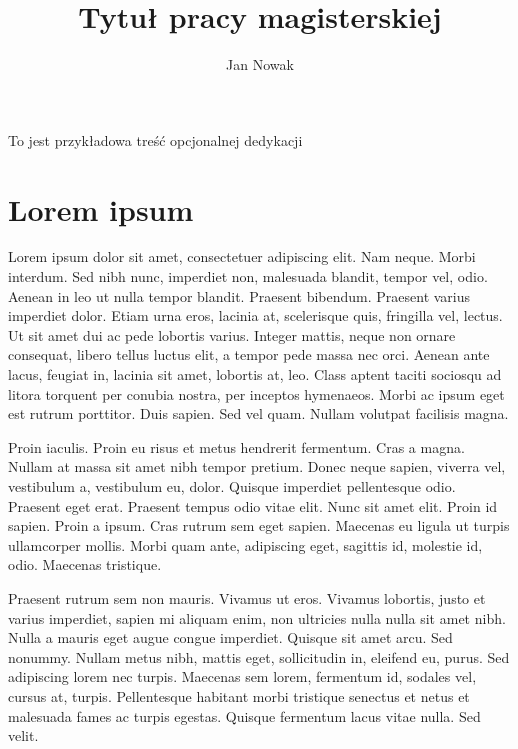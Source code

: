 \documentclass[printmode]{mgr}
\title{Tytuł pracy magisterskiej}
\author{Jan Nowak}
\begin{document}
\maketitle %

\dedication{6cm}{To jest przykładowa treść opcjonalnej dedykacji}
\tableofcontents %

\chapter{Lorem ipsum}
\cite{einstein}Lorem ipsum dolor sit amet, consectetuer adipiscing elit. Nam
neque. Morbi interdum. Sed nibh nunc, imperdiet non, malesuada
blandit, tempor vel, odio. Aenean in leo ut nulla tempor
blandit. Praesent bibendum. Praesent varius imperdiet dolor. Etiam
urna eros, lacinia at, scelerisque quis, fringilla vel, lectus. Ut sit
amet dui ac pede lobortis varius. Integer mattis, neque non ornare
consequat, libero tellus luctus elit, a tempor pede massa nec
orci. Aenean ante lacus, feugiat in, lacinia sit amet, lobortis at,
leo. Class aptent taciti sociosqu ad litora torquent per conubia
nostra, per inceptos hymenaeos. Morbi ac ipsum eget est rutrum
porttitor. Duis sapien. Sed vel quam. Nullam volutpat facilisis magna.

Proin iaculis. Proin eu risus et metus hendrerit fermentum. Cras a
magna. Nullam at massa sit amet nibh tempor pretium. Donec neque
sapien, viverra vel, vestibulum a, vestibulum eu, dolor. Quisque
imperdiet pellentesque odio. Praesent eget erat. Praesent tempus odio
vitae elit. Nunc sit amet elit. Proin id sapien. Proin a ipsum. Cras
rutrum sem eget sapien. Maecenas eu ligula ut turpis ullamcorper
mollis. Morbi quam ante, adipiscing eget, sagittis id, molestie id,
odio. Maecenas tristique.

Praesent rutrum sem non mauris. Vivamus ut eros. Vivamus lobortis,
justo et varius imperdiet, sapien mi aliquam enim, non ultricies nulla
nulla sit amet nibh. Nulla a mauris eget augue congue
imperdiet. Quisque sit amet arcu. Sed nonummy. Nullam metus nibh,
mattis eget, sollicitudin in, eleifend eu, purus. Sed adipiscing lorem
nec turpis. Maecenas sem lorem, fermentum id, sodales vel, cursus at,
turpis. Pellentesque habitant morbi tristique senectus et netus et
malesuada fames ac turpis egestas. Quisque fermentum lacus vitae
nulla. Sed velit.
\end{document}
